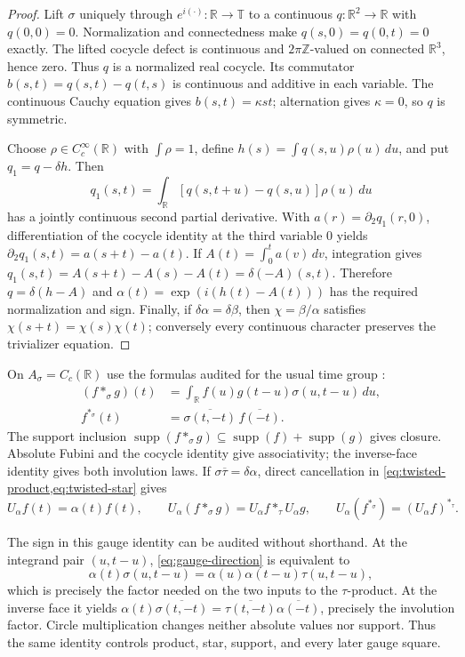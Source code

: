 \documentclass[11pt]{article}
\theoremstyle{definition}
\newcommand{\R}{\mathbb R}
\newcommand{\Z}{\mathbb Z}
\newcommand{\T}{\mathbb T}
\newcommand{\supp}{\operatorname{supp}}
\begin{document}
\begin{proof}
Lift $\sigma$ uniquely through $e^{i(\cdot)}:\R\to\T$ to a continuous
$q:\R^2\to\R$ with $q(0,0)=0$.  Normalization and connectedness make
$q(s,0)=q(0,t)=0$ exactly.  The lifted cocycle defect is continuous and
$2\pi\Z$-valued on connected $\R^3$, hence zero.  Thus $q$ is a normalized
real cocycle.  Its commutator $b(s,t)=q(s,t)-q(t,s)$ is continuous and
additive in each variable.  The continuous Cauchy equation gives
$b(s,t)=\kappa st$; alternation gives $\kappa=0$, so $q$ is symmetric.

Choose $\rho\in C_c^\infty(\R)$ with $\int\rho=1$, define
$h(s)=\int q(s,u)\rho(u)\,du$, and put $q_1=q-\delta h$.  Then
\[
 q_1(s,t)=\int_{\R}[q(s,t+u)-q(s,u)]\rho(u)\,du
\]
has a jointly continuous second partial derivative.  With
$a(r)=\partial_2q_1(r,0)$, differentiation of the cocycle identity at the
third variable $0$ yields
$\partial_2q_1(s,t)=a(s+t)-a(t)$.  If
$A(t)=\int_0^t a(v)\,dv$, integration gives
$q_1(s,t)=A(s+t)-A(s)-A(t)=\delta(-A)(s,t)$.  Therefore
$q=\delta(h-A)$ and
$\alpha(t)=\exp(i(h(t)-A(t)))$ has the required normalization and sign.
Finally, if $\delta\alpha=\delta\beta$, then
$\chi=\beta/\alpha$ satisfies $\chi(s+t)=\chi(s)\chi(t)$; conversely every
continuous character preserves the trivializer equation.
\end{proof}

On $A_\sigma=C_c(\R)$ use the formulas audited for the usual time group
\citep[pp.~5--6]{Austad2021Spectral}:
\begin{align}
 (f*_{\sigma}g)(t)
   &=\int_{\R}f(u)g(t-u)\sigma(u,t-u)\,du,
   \label{eq:twisted-product}\\
 f^{*_{\sigma}}(t)
   &=\overline{\sigma(t,-t)}\,\overline{f(-t)}.
   \label{eq:twisted-star}
\end{align}
The support inclusion
$\supp(f*_{\sigma}g)\subseteq\supp(f)+\supp(g)$ gives closure.
Absolute Fubini and the cocycle identity give associativity; the inverse-face
identity gives both involution laws.  If
$\sigma\overline\tau=\delta\alpha$, direct cancellation in
\cref{eq:twisted-product,eq:twisted-star} gives
\[
 U_\alpha f(t)=\alpha(t)f(t),\qquad
 U_\alpha(f*_{\sigma}g)=U_\alpha f*_{\tau}U_\alpha g,
 \qquad U_\alpha(f^{*_{\sigma}})=(U_\alpha f)^{*_{\tau}}.
\]

The sign in this gauge identity can be audited without shorthand.  At the
integrand pair $(u,t-u)$, \cref{eq:gauge-direction} is equivalent to
\[
 \alpha(t)\sigma(u,t-u)
 =\alpha(u)\alpha(t-u)\tau(u,t-u),
\]
which is precisely the factor needed on the two inputs to the $\tau$-product.
At the inverse face it yields
$\alpha(t)\overline{\sigma(t,-t)}=
\overline{\tau(t,-t)}\overline{\alpha(-t)}$, precisely the involution
factor.  Circle multiplication changes neither absolute values nor support.
Thus the same identity controls product, star, support, and every later
gauge square.
\end{document}
